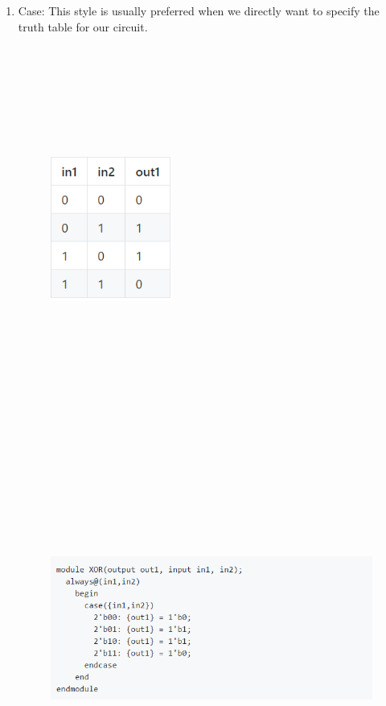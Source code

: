 \documentclass[11pt]{article}
\begin{document}
\begin{enumerate}
\item Case: 
This style is usually preferred when we directly want to specify the truth table for our circuit. \bigskip
\begin{figure}[ht!]
\centering
\includegraphics[width=4cm,height=12cm,keepaspectratio]{case_1.png}
\includegraphics[width=11cm,height=14cm,keepaspectratio]{case_2.png}
\label{Case statements exmaple}
\end{figure}


\end{enumerate}
\end{document}
